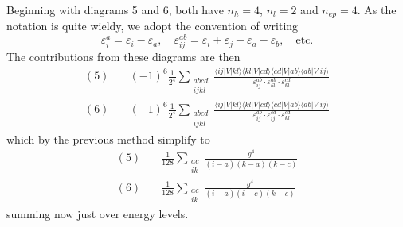Beginning with diagrams 5 and 6, both have $n_h = 4$, $n_l = 2$ and $n_{ep} = 4$.
As the notation is quite wieldy, we adopt the convention of writing
\begin{equation*}
    \varepsilon_i^a = \varepsilon_i - \varepsilon_a, \quad \varepsilon_{ij}^{ab} = \varepsilon_i + \varepsilon_j - \varepsilon_a - \varepsilon_b, \quad \text{etc.}
\end{equation*}
The contributions from these diagrams are then
\begin{align*}
    (5) \quad& (-1)^6 \frac{1}{2^4} \sum_{\substack{abcd \\ ijkl}} \frac{
        \langle ij \vert V \vert kl \rangle
        \langle kl \vert V \vert cd \rangle
        \langle cd \vert V \vert ab \rangle
        \langle ab \vert V \vert ij \rangle
    }{
        \varepsilon_{ij}^{ab} \cdot
        \varepsilon_{kl}^{ab} \cdot
        \varepsilon_{kl}^{cd}
    } \\
    (6) \quad& (-1)^6 \frac{1}{2^4} \sum_{\substack{abcd \\ ijkl}} \frac{
        \langle ij \vert V \vert kl \rangle
        \langle kl \vert V \vert cd \rangle
        \langle cd \vert V \vert ab \rangle
        \langle ab \vert V \vert ij \rangle
    }{
        \varepsilon_{ij}^{ab} \cdot
        \varepsilon_{ij}^{cd} \cdot
        \varepsilon_{kl}^{cd}
    }
\end{align*}
which by the previous method simplify to
\begin{align*}
    (5) \quad& \frac{1}{128} \sum_{\substack{ac\\ik}} \frac{
        g^4
    }{
        (i - a)(k - a)(k - c)
    } \\
    (6) \quad& \frac{1}{128} \sum_{\substack{ac\\ik}} \frac{
        g^4
    }{
        (i - a)(i - c)(k - c)
    }
\end{align*}
summing now just over energy levels.

